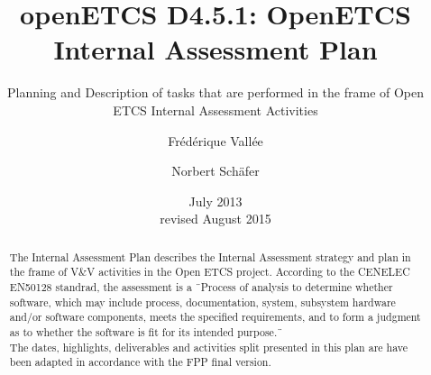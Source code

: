 \documentclass{template/openetcs_article}
\begin{document}
\frontmatter
{}




\title{openETCS D4.5.1: OpenETCS Internal Assessment Plan}

\subtitle{Planning and Description of tasks that are performed in the frame of Open ETCS Internal Assessment Activities}

\date{July 2013\\revised August 2015}

\author{Fr\'ed\'erique Vall\'ee}


\author{Norbert Sch\"afer}









\begin{abstract}
The Internal Assessment Plan describes the Internal Assessment strategy and plan in the frame of V\&V activities in the Open ETCS project.
According to the CENELEC EN50128 standrad, the assessment is a \"\ Process of analysis to determine whether software, which may include process, documentation, system, subsystem hardware and/or software components, meets the specified requirements, and to form a judgment as to whether the software is fit for its intended purpose.\"\
\\
The dates, highlights, deliverables and activities split presented in this plan are have been adapted in accordance with the FPP final version.
\end{abstract}
\end{document}
